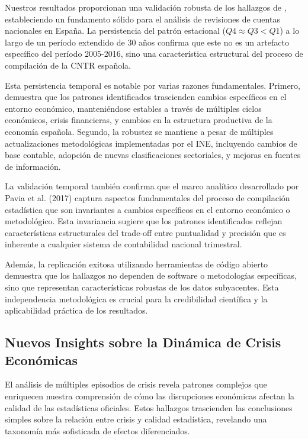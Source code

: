 \documentclass[12pt,a4paper]{article}
\begin{document}
Nuestros resultados proporcionan una validación robusta de los hallazgos de \citet{pavia2017}, estableciendo un fundamento sólido para el análisis de revisiones de cuentas nacionales en España. La persistencia del patrón estacional ($Q4 \approx Q3 < Q1$) a lo largo de un período extendido de 30 años confirma que este no es un artefacto específico del período 2005-2016, sino una característica estructural del proceso de compilación de la CNTR española.

Esta persistencia temporal es notable por varias razones fundamentales. Primero, demuestra que los patrones identificados trascienden cambios específicos en el entorno económico, manteniéndose estables a través de múltiples ciclos económicos, crisis financieras, y cambios en la estructura productiva de la economía española. Segundo, la robustez se mantiene a pesar de múltiples actualizaciones metodológicas implementadas por el INE, incluyendo cambios de base contable, adopción de nuevas clasificaciones sectoriales, y mejoras en fuentes de información.

La validación temporal también confirma que el marco analítico desarrollado por Pavia et al. (2017) captura aspectos fundamentales del proceso de compilación estadística que son invariantes a cambios específicos en el entorno económico o metodológico. Esta invariancia sugiere que los patrones identificados reflejan características estructurales del trade-off entre puntualidad y precisión que es inherente a cualquier sistema de contabilidad nacional trimestral.

Además, la replicación exitosa utilizando herramientas de código abierto demuestra que los hallazgos no dependen de software o metodologías específicas, sino que representan características robustas de los datos subyacentes. Esta independencia metodológica es crucial para la credibilidad científica y la aplicabilidad práctica de los resultados.

\subsection{Nuevos Insights sobre la Dinámica de Crisis Económicas}

El análisis de múltiples episodios de crisis revela patrones complejos que enriquecen nuestra comprensión de cómo las disrupciones económicas afectan la calidad de las estadísticas oficiales. Estos hallazgos trascienden las conclusiones simples sobre la relación entre crisis y calidad estadística, revelando una taxonomía más sofisticada de efectos diferenciados.
\end{document}
